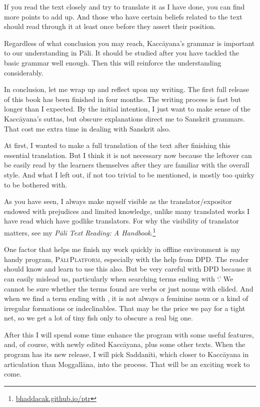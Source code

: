If you read the text closely and try to translate it as I have done, you can find more points to add up. And those who have certain beliefs related to the text should read through it at least once before they assert their position.

Regardless of what conclusion you may reach, Kaccāyana's grammar is important to our understanding in Pāli. It should be studied after you have tackled the basic grammar well enough. Then this will reinforce the understanding considerably.

In conclusion, let me wrap up and reflect upon my writing. The first full release of this book has been finished in four months. The writing process is fast but longer than I expected. By the initial intention, I just want to make sense of the Kaccāyana's suttas, but obscure explanations direct me to Sanskrit grammars. That cost me extra time in dealing with Sanskrit also.

At first, I wanted to make a full translation of the text after finishing this essential translation. But I think it is not necessary now because the leftover can be easily read by the learners themselves after they are familiar with the overall style. And what I left out, if not too trivial to be mentioned, is mostly too quirky to be bothered with.

As you have seen, I always make myself visible as the translator/expositor endowed with prejudices and limited knowledge, unlike many translated works I have read which have godlike translators. For why the visibility of translator matters, see my \emph{Pāli Text Reading: A Handbook}.\footnote{\url{bhaddacak.github.io/ptr}}

One factor that helps me finish my work quickly in offline environment is my handy program, \textsc{Pāli\,Platform}, especially with the help from DPD. The reader should know and learn to use this also. But be very careful with DPD because it can easily mislead us, particularly when searching terms ending with `.' We cannot be sure whether the terms found are verbs or just nouns with  elided. And when we find a term ending with , it is not always a feminine noun or a kind of irregular formations or indeclinables. That may be the price we pay for a tight net, so we get a lot of tiny fish only to obscure a real big one.

After this I will spend some time enhance the program with some useful features, and, of course, with newly edited Kaccāyana, plus some other texts. When the program has its new release, I will pick Saddanīti, which closer to Kaccāyana in articulation than Moggallāna, into the process. That will be an exciting work to come.
